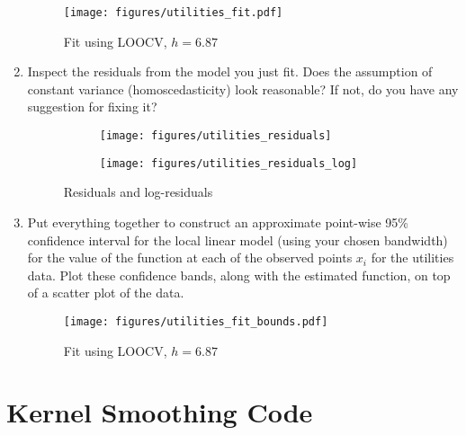 \documentclass[10pt]{article}
\begin{document}
\begin{enumerate}[label=(\Alph*)]
        \begin{figure}[ht] 
          \centering 
          \texttt{[image: figures/utilities\_fit.pdf]}
          \caption{\label{fig:utilities_fit} Fit using LOOCV, $h=6.87$}
        \end{figure}

        \item Inspect the residuals from the model you just fit.  Does the assumption of constant variance (homoscedasticity) look reasonable?  If not, do you have any suggestion for fixing it?

        \begin{figure}
            \begin{subfigure}{.5\textwidth}
              \centering
              \texttt{[image: figures/utilities\_residuals]}
            \end{subfigure}%
            \begin{subfigure}{.5\textwidth}
              \centering
              \texttt{[image: figures/utilities\_residuals\_log]}
            \end{subfigure}
        \caption{Residuals and log-residuals}
        \label{fig:standard_error}
        \end{figure}

        \item Put everything together to construct an approximate point-wise 95\% confidence interval for the local linear model (using your chosen bandwidth) for the value of the function at each of the observed points $x_i$ for the utilities data. Plot these confidence bands, along with the estimated function, on top of a scatter plot of the data.

        \begin{figure}[ht] 
          \centering 
          \texttt{[image: figures/utilities\_fit\_bounds.pdf]}
          \caption{\label{fig:utilities_fit_bounds} Fit using LOOCV, $h=6.87$}
        \end{figure}

    \end{enumerate}

    \clearpage
    \appendix
    \section{Kernel Smoothing Code}
\end{document}
